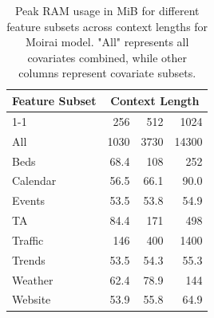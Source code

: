 \begin{table}[htbp]
\centering
\footnotesize
\begin{tabular}{lrrr}
\toprule
\textbf{Feature Subset} & \multicolumn{3}{c}{\textbf{Context Length}} \\
\cmidrule{1-1} \cmidrule{2-4}
               & 256 & 512 & 1024 \\
\midrule
All            & 1030 & 3730 & 14300 \\
Beds           & 68.4 & 108 & 252 \\
Calendar       & 56.5 & 66.1 & 90.0 \\
Events         & 53.5 & 53.8 & 54.9 \\
TA             & 84.4 & 171 & 498 \\
Traffic        & 146 & 400 & 1400 \\
Trends         & 53.5 & 54.3 & 55.3 \\
Weather        & 62.4 & 78.9 & 144 \\
Website        & 53.9 & 55.8 & 64.9 \\
\bottomrule
\end{tabular}
\caption{Peak RAM usage in MiB for different feature subsets across context lengths for Moirai model. "All" represents all covariates combined, while other columns represent covariate subsets.}
\label{tab:ram_subset}
\end{table}
